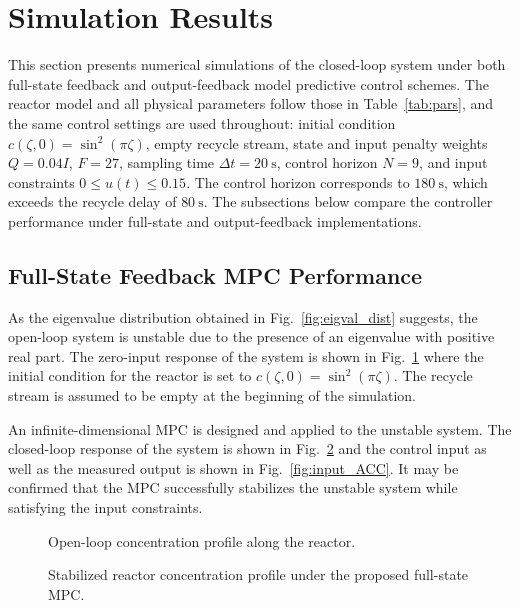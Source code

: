 \section{Simulation Results}

This section presents numerical simulations of the closed-loop system under both full-state feedback and output-feedback model predictive control schemes. The reactor model and all physical parameters follow those in Table~\ref{tab:pars}, and the same control settings are used throughout: initial condition $c(\zeta, 0) = \sin^2(\pi \zeta)$, empty recycle stream, state and input penalty weights $Q = 0.04 I$, $F = 27$, sampling time $\Delta t = 20~\mathrm{s}$, control horizon $N = 9$, and input constraints $0 \leq u(t) \leq 0.15$. The control horizon corresponds to $180~\mathrm{s}$, which exceeds the recycle delay of $80~\mathrm{s}$. The subsections below compare the controller performance under full-state and output-feedback implementations.

\subsection{Full-State Feedback MPC Performance}

As the eigenvalue distribution obtained in Fig.~\ref{fig:eigval_dist} suggests, the open-loop system is unstable due to the presence of an eigenvalue with positive real part. The zero-input response of the system is shown in Fig.~\ref{fig:open_ACC} where the initial condition for the reactor is set to $c(\zeta ,0) = \sin^2(\pi \zeta)$. The recycle stream is assumed to be empty at the beginning of the simulation.

An infinite-dimensional MPC is designed and applied to the unstable system. The closed-loop response of the system is shown in Fig.~\ref{fig:closed_ACC} and the control input as well as the measured output is shown in Fig.~\ref{fig:input_ACC}. It may be confirmed that the MPC successfully stabilizes the unstable system while satisfying the input constraints.

\begin{figure}[!htbp]
    \centering
    
    \caption{Open-loop concentration profile along the reactor.}
    \label{fig:open_ACC}
\end{figure}

\begin{figure}[!htbp]
    \centering
    
    \caption{Stabilized reactor concentration profile under the proposed full-state MPC.}
    \label{fig:closed_ACC}
\end{figure}

